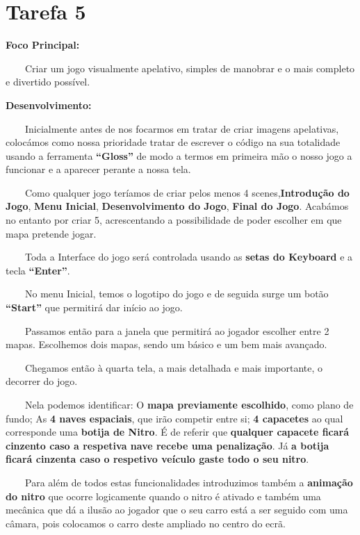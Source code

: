 \documentclass[a4paper]{report} %
\begin{document}
           \section{Tarefa 5}
        
           \vspace{5mm} 
           \par \textbf{ Foco Principal:} 
           \par \ \ \ \ Criar um jogo visualmente apelativo, simples de manobrar e o mais completo e divertido possível.
           \vspace{5mm}
           \par \textbf{Desenvolvimento:}
           \par \ \ \ \  Inicialmente antes de nos focarmos em tratar de criar imagens apelativas, colocámos como nossa prioridade tratar de escrever o código na sua totalidade usando a ferramenta \textbf{“Gloss”} de modo a termos em primeira mão o nosso jogo a funcionar e a aparecer perante a nossa tela.  
           \par \ \ \ \ Como qualquer jogo teríamos de criar pelos menos 4 scenes,\textbf{Introdução do Jogo}, \textbf{Menu Inicial}, \textbf{Desenvolvimento do Jogo}, \textbf{Final do Jogo}. Acabámos no entanto por criar 5, acrescentando a possibilidade  de poder escolher em que mapa pretende jogar.
           \par \ \ \ \ Toda a Interface do jogo será controlada usando as \textbf{setas do Keyboard} e a tecla \textbf{“Enter”}.
           \par \ \ \ \ No menu Inicial, temos o logotipo do jogo e de seguida surge um botão \textbf{“Start”} que permitirá dar início ao jogo.
           \par \ \ \ \ Passamos então para a janela que permitirá ao jogador escolher entre 2 mapas. Escolhemos dois mapas, sendo um básico e um bem mais avançado.
           \par \ \ \ \ Chegamos então à quarta tela, a mais detalhada e mais importante, o decorrer do jogo. 
           \par \ \ \ \ Nela podemos identificar: O \textbf{mapa previamente escolhido}, como plano de fundo; As \textbf{4 naves espaciais}, que irão competir entre si; \textbf{4 capacetes} ao qual corresponde uma \textbf{botija de Nitro}. É de referir que \textbf{qualquer capacete ficará cinzento caso a respetiva nave recebe uma penalização}. Já \textbf{a botija ficará cinzenta caso o respetivo veículo gaste todo o seu nitro}.
           \par \ \ \ \ Para além de todos estas funcionalidades introduzimos também a \textbf{animação do nitro} que ocorre logicamente quando o nitro é ativado e também uma mecânica que dá a ilusão ao jogador que o seu carro está a ser seguido com uma câmara, pois colocamos o carro deste ampliado no centro do ecrã. 
\end{document}
